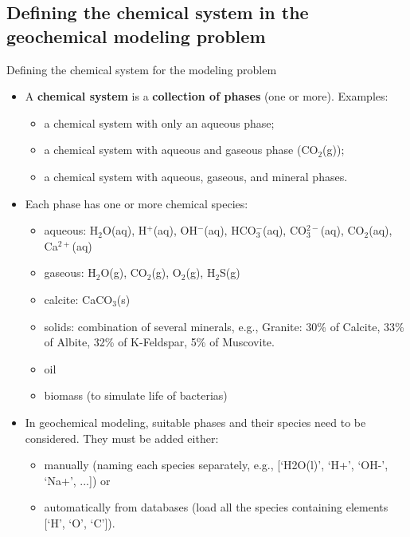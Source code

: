 \subsection{Defining the chemical system in the geochemical modeling problem}
%
\begin{frame}{Defining the chemical system for the modeling problem}
\begin{itemize}
\item A {\bf chemical system} is a \alert{\bf collection of phases} (one or more). Examples:
\begin{itemize}
\item a chemical system with only an aqueous phase;
\item a chemical system with aqueous and gaseous phase (CO$_2$(g));
\item a chemical system with aqueous, gaseous, and mineral phases.
\end{itemize}
\pause
\item Each phase has one or more chemical species:
\begin{itemize}
\item aqueous: H$_{2}$O(aq), H$^{+}$(aq), OH$^{-}$(aq), HCO$_{3}^{-}$(aq),
CO$_{3}^{2-}$(aq), CO$_{2}$(aq), Ca$^{2+}$(aq)
\item gaseous: H$_{2}$O(g), CO$_{2}$(g), O$_{2}$(g), H$_{2}$S(g)
\item calcite: CaCO$_{3}$(s)
\item solids: combination of several minerals, e.g., Granite: 30\% of Calcite, 33\% of Albite, 32\% of K-Feldspar, 5\% of Muscovite. 
\item oil
\item biomass (to simulate life of bacterias)
\end{itemize}
\pause
\item In geochemical modeling, suitable phases and their species need to
be considered. They must be added either: 
\begin{itemize}
\item manually (naming each species separately, e.g., [`H2O(l)', `H+', `OH-', `Na+', ...]) or 
\item automatically from databases (load all the species containing elements [`H', `O', `C']).
\end{itemize}
\end{itemize}
\end{frame}
%
